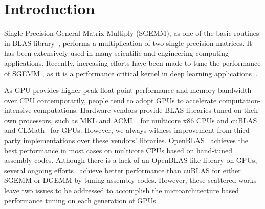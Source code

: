 \section{Introduction}
Single Precision General Matrix Multiply (SGEMM), as one 
of the basic routines in BLAS library~\cite{blas}, performs a multiplication of two single-precision matrices. 
It has been extensively used in many scientific and engineering 
computing applications. 
Recently, increasing efforts have been made to tune the performance of SGEMM , as it is a performance 
critical kernel in deep learning applications~\cite{chetlur2014cudnn,nervana_sgemm_wiki}.

As GPU provides higher peak float-point performance and memory bandwidth over CPU contemporarily, people tend to adopt GPUs to accelerate
computation-intensive computations. %
Hardware vendors provide BLAS libraries tuned on their own processors, such as MKL and ACML~\cite{intel2007intel,amd2014} for multicore 
x86 CPUs and cuBLAS and CLMath~\cite{nvidia2008cuBLAS, clmath} for
GPUs. However, we always witness improvement from third-party implementations over these vendors' libraries. OpenBLAS~\cite{xianyi2012openblas} achieves the best performance in most cases on multicore CPUs based on hand-tuned assembly codes.
Although there is a lack of an OpenBLAS-like library on GPUs, several ongoing efforts~\cite{tan,lai,nervana_sgemm_wiki,
chien, volkov} achieve better performance than cuBLAS for either SGEMM or DGEMM by tuning assembly codes. However, 
these scattered works leave two issues to be addressed to accomplish the microarchitecture based performance tuning on 
each generation of GPUs.

